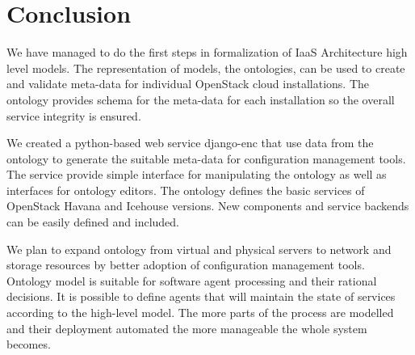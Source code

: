 
\section{Conclusion}

We have managed to do the first steps in formalization of IaaS Architecture high level models. The representation of models, the ontologies, can be used to create and validate meta-data for individual OpenStack cloud installations. The ontology provides schema for the meta-data for each installation so the overall service integrity is ensured.

We created a python-based web service django-enc that use data from the ontology to generate the suitable meta-data for configuration management tools. The service provide simple interface for manipulating the ontology as well as interfaces for ontology editors. The ontology defines the basic services of OpenStack Havana and Icehouse versions. New components and service backends can be easily defined and included.



We plan to expand  ontology from virtual and physical servers to network and storage resources by better adoption of configuration management tools. Ontology model is suitable for software agent processing and their rational decisions. It is possible to define agents that will maintain the state of services according to the high-level model. The more parts of the process are modelled and their deployment automated the more manageable the whole system becomes.
